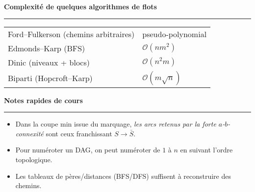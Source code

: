\documentclass[9pt,a4paper]{article}
\newcommand{\bigO}{\mathcal{O}}
\newcommand{\sect}[1]{\vspace{1ex}\textbf{\large #1}\par\vspace{0.3ex}\hrule\vspace{0.6ex}}
\begin{document}
\begin{multicols}{3}
    \sect{Complexité de quelques algorithmes de flots}
    \begin{tabularx}{\linewidth}{@{}l>{\raggedleft\arraybackslash}X@{}}
        Ford--Fulkerson (chemins arbitraires) & pseudo-polynomial  \\
        Edmonds--Karp (BFS)                   & $\bigO(n m^2)$     \\
        Dinic (niveaux + blocs)               & $\bigO(n^2 m)$     \\
        Biparti (Hopcroft--Karp)              & $\bigO(m\sqrt{n})$ \\
    \end{tabularx}

    \sect{Notes rapides de cours}
    \begin{itemize}
        \item Dans la coupe min issue du marquage, \emph{les arcs retenus par la forte $a$-$b$-connexité} sont ceux franchissant $S\to\bar S$.
        \item Pour numéroter un DAG, on peut numéroter de $1$ à $n$ en suivant l'ordre topologique.
        \item Les tableaux de pères/distances (BFS/DFS) suffisent à reconstruire des chemins.
    \end{itemize}

\end{multicols}
\end{document}

